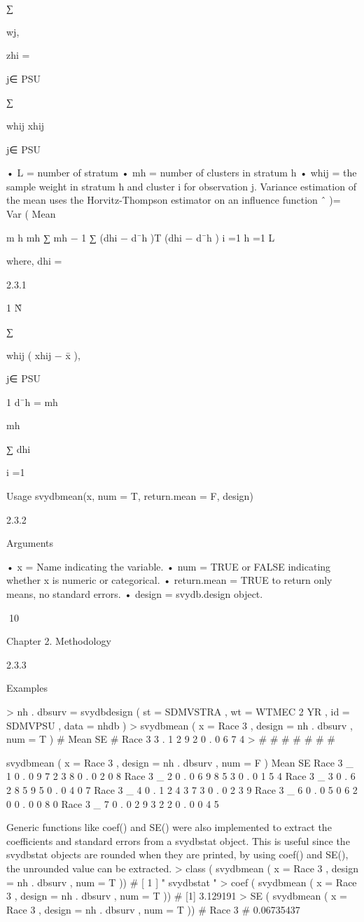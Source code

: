 ∑

wj,

zhi =

j∈ PSU

∑

whij xhij

j∈ PSU

• L = number of stratum
• mh = number of clusters in stratum h
• whij = the sample weight in stratum h and cluster i for observation j.
Variance estimation of the mean uses the Horvitz-Thompson estimator on an influence function
ˆ )=
Var ( Mean

m h mh
∑ mh − 1 ∑ (dhi − d¯h )T (dhi − d¯h )
i =1
h =1
L

where,
dhi =

2.3.1

1
N̂

∑

whij ( xhij − x̄ ),

j∈ PSU

1
d¯h =
mh

mh

∑ dhi

i =1

Usage
svydbmean(x, num = T, return.mean = F, design)

2.3.2

Arguments

• x = Name indicating the variable.
• num = TRUE or FALSE indicating whether x is numeric or categorical.
• return.mean = TRUE to return only means, no standard errors.
• design = svydb.design object.

10

Chapter 2. Methodology

2.3.3

Examples

> nh . dbsurv = svydbdesign ( st = SDMVSTRA , wt = WTMEC 2 YR ,
id = SDMVPSU , data = nhdb )
> svydbmean ( x = Race 3 , design = nh . dbsurv , num = T )
#
Mean
SE
# Race 3 3 . 1 2 9 2 0 . 0 6 7 4
>
#
#
#
#
#
#
#

svydbmean ( x = Race 3 , design = nh . dbsurv , num = F )
Mean
SE
Race 3 _ 1 0 . 0 9 7 2 3 8 0 . 0 2 0 8
Race 3 _ 2 0 . 0 6 9 8 5 3 0 . 0 1 5 4
Race 3 _ 3 0 . 6 2 8 5 9 5 0 . 0 4 0 7
Race 3 _ 4 0 . 1 2 4 3 7 3 0 . 0 2 3 9
Race 3 _ 6 0 . 0 5 0 6 2 0 0 . 0 0 8 0
Race 3 _ 7 0 . 0 2 9 3 2 2 0 . 0 0 4 5

Generic functions like coef() and SE() were also implemented to extract the
coefficients and standard errors from a svydbstat object. This is useful since the
svydbstat objects are rounded when they are printed, by using coef() and SE(), the
unrounded value can be extracted.
> class ( svydbmean ( x = Race 3 , design = nh . dbsurv , num = T ))
# [ 1 ] " svydbstat "
> coef ( svydbmean ( x = Race 3 , design = nh . dbsurv , num = T ))
# [1] 3.129191
> SE ( svydbmean ( x = Race 3 , design = nh . dbsurv , num = T ))
#
Race 3
# 0.06735437


